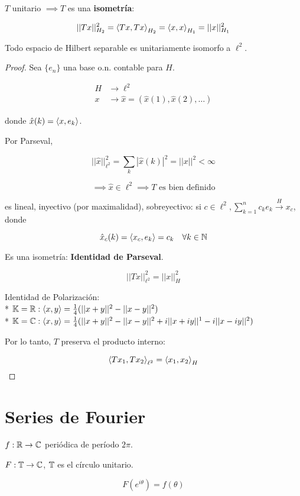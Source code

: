 $T$ unitario $\implies T$ es una \textbf{isometría}:

\[||Tx||_{H_2}^2=\left\langle Tx,Tx\right\rangle_{H_2}=\left\langle x,x\right\rangle_{H_1}=||x||_{H_1}^2\]

\begin{ftheorem}
    Todo espacio de Hilbert separable es unitariamente isomorfo a $\ell^2$.
\end{ftheorem}

\begin{proof}
    Sea $\{e_n\}$ una base o.n. contable para $H$.

    \begin{align*}
        H&\to \ell^2\\
        x&\to \hat x=(\hat x(1),\hat x(2),\ldots)
    \end{align*}

    donde $\hat x(k)=\left\langle x,e_k\right\rangle$.

    Por Parseval,

    \[||\hat x||_{\ell^2}^2=\sum_{k}|\hat x(k)|^2=||x||^2<\infty\]

    \[\implies \hat x\in \ell^2\implies T\text{ es bien definido}\]

    es lineal, inyectivo (por maximalidad), sobreyectivo: si $c\in\ell^2, \sum_{k=1}^n c_k e_k\xrightarrow{H} x_c$, donde 

    \[\hat x_c(k)=\left\langle x_c,e_k\right\rangle=c_k\quad\forall k\in\mathbb{N}\]

    Es una isometría: \textbf{Identidad de Parseval}.

    \[||Tx||_{\ell^2}^2=||x||_H^2\]

    Identidad de Polarización:\\*
    $\mathbb{K}=\mathbb{R}:\left\langle x,y\right\rangle=\frac{1}{4}(||x+y||^2-||x-y||^2)$\\*
    $\mathbb{K}=\mathbb{C}:\left\langle x,y\right\rangle=\frac{1}{4}(||x+y||^2-||x-y||^2+i||x+iy||^1-i||x-iy||^2)$

    Por lo tanto, $T$ preserva el producto interno:

    \[\left\langle Tx_1,Tx_2\right\rangle_{\ell^2}=\left\langle x_1,x_2\right\rangle_H\]
\end{proof}

\section{Series de Fourier}

$f:\mathbb{R}\to\mathbb{C}$ periódica de período $2\pi$.

$F:\mathbb{T}\to\mathbb{C}$, $\mathbb{T}$ es el círculo unitario.

\[F(e^{i\theta})=f(\theta)\]

